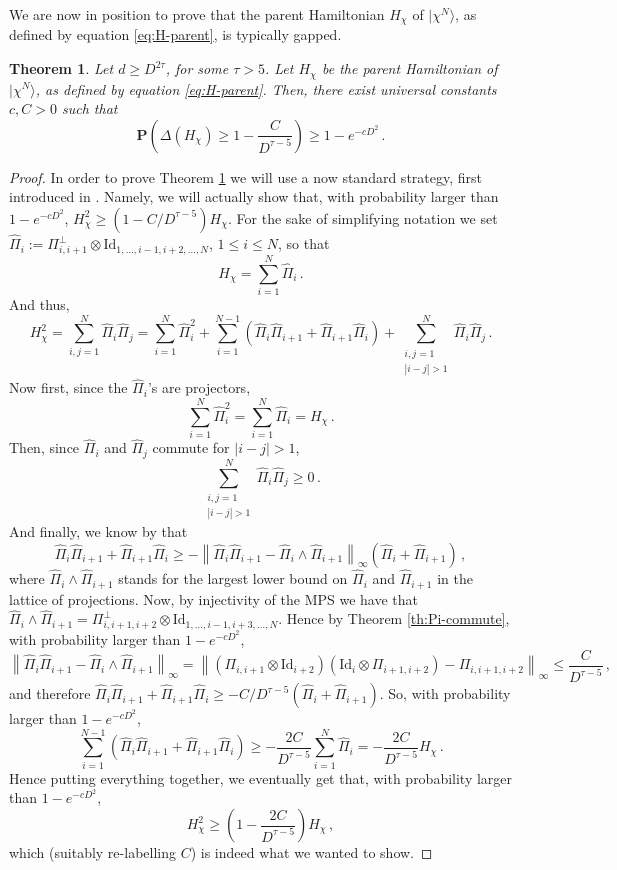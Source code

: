 \documentclass{amsart}
\newtheorem{theorem}{Theorem}[section]
\renewcommand{\P}{\mathbf{P}}
\renewcommand{\leq}{\leqslant}
\renewcommand{\geq}{\geqslant}
\newcommand{\Id}{\mathrm{Id}}
\newcommand{\ket}[1]{| #1 \rangle}
\begin{document}
We are now in position to prove that the parent Hamiltonian $H_{\chi}$ of $\ket{\chi^N}$, as defined by equation \eqref{eq:H-parent}, is typically gapped.

\begin{theorem} \label{th:gap-H}
    Let $d\geq D^{2\tau}$, for some $\tau>5$. Let $H_{\chi}$ be the parent Hamiltonian of $\ket{\chi^N}$, as defined by equation \eqref{eq:H-parent}. Then, there exist universal constants $c,C>0$ such that
    \[ \P\left( \Delta(H_{\chi}) \geq 1-\frac{C}{D^{\tau-5}} \right) \geq 1-e^{-cD^2} \, . \]
\end{theorem}


\begin{proof}
    In order to prove Theorem \ref{th:gap-H} we will use a now standard strategy, first introduced in \cite[Theorem 6.4]{FNW}. Namely, we will actually show that, with probability larger than $1-e^{-cD^2}$, $H_{\chi}^2\geq (1-C/D^{\tau-5})H_{\chi}$. For the sake of simplifying notation we set $\hat{\Pi}_i:= \Pi_{i,i+1}^{\perp}\otimes\Id_{1,\ldots,i-1,i+2,\ldots,N}$, $1\leq i\leq N$, so that
    \[ H_{\chi} = \sum_{i=1}^N \hat{\Pi}_i \, . \]
    And thus,
    \[ H_{\chi}^2 = \sum_{i,j=1}^N \hat{\Pi}_i\hat{\Pi}_j = \sum_{i=1}^N \hat{\Pi}_i^2 + \sum_{i=1}^{N-1} \left(\hat{\Pi}_i\hat{\Pi}_{i+1} + \hat{\Pi}_{i+1}\hat{\Pi}_i \right) + \sum_{\substack{i,j=1 \\ |i-j|>1}}^N \hat{\Pi}_i\hat{\Pi}_j \, . \]
    Now first, since the $\hat{\Pi}_i$'s are projectors,
    \[ \sum_{i=1}^N \hat{\Pi}_i^2 = \sum_{i=1}^N \hat{\Pi}_i = H_{\chi} \, . \]
    Then, since $\hat{\Pi}_i$ and $\hat{\Pi}_j$ commute for $|i-j|>1$,
    \[ \sum_{\substack{i,j=1 \\ |i-j|>1}}^N \hat{\Pi}_i\hat{\Pi}_j \geq 0 \, . \]
    And finally, we know by \cite[Lemma 3]{FNW} that
    \[ \hat{\Pi}_i\hat{\Pi}_{i+1} + \hat{\Pi}_{i+1}\hat{\Pi}_i \geq - \left\|\hat{\Pi}_i\hat{\Pi}_{i+1}-\hat{\Pi}_i\wedge\hat{\Pi}_{i+1}\right\|_\infty \left(\hat{\Pi}_i+\hat{\Pi}_{i+1}\right) \, , \]
    where $\hat{\Pi}_i\wedge\hat{\Pi}_{i+1}$ stands for the largest lower bound on $\hat{\Pi}_i$ and $\hat{\Pi}_{i+1}$ in the lattice of projections. Now, by injectivity of the MPS we have that $\hat{\Pi}_i\wedge\hat{\Pi}_{i+1}=\Pi_{i,i+1,i+2}^\perp\otimes\Id_{1,\ldots,i-1,i+3,\ldots,N}$. Hence by Theorem \ref{th:Pi-commute}, with probability larger than $1-e^{-cD^2}$,
    \[ \left\|\hat{\Pi}_i\hat{\Pi}_{i+1}-\hat{\Pi}_i\wedge\hat{\Pi}_{i+1}\right\|_\infty = \left\|\left(\Pi_{i,i+1}\otimes\Id_{i+2}\right)\left(\Id_i\otimes\Pi_{i+1,i+2}\right)-\Pi_{i,i+1,i+2}\right\|_\infty \leq \frac{C}{D^{\tau-5}} \, , \]
    and therefore $\hat{\Pi}_i\hat{\Pi}_{i+1}+\hat{\Pi}_{i+1}\hat{\Pi}_i\geq -C/D^{\tau-5}(\hat{\Pi}_i+\hat{\Pi}_{i+1})$. So, with probability larger than $1-e^{-cD^2}$,
    \[ \sum_{i=1}^{N-1} \left(\hat{\Pi}_i\hat{\Pi}_{i+1} + \hat{\Pi}_{i+1}\hat{\Pi}_i \right) \geq -\frac{2C}{D^{\tau-5}} \sum_{i=1}^{N}\hat{\Pi}_i = -\frac{2C}{D^{\tau-5}}H_{\chi} \, . \]
    Hence putting everything together, we eventually get that, with probability larger than $1-e^{-cD^2}$,
    \[ H_{\chi}^2 \geq \left(1-\frac{2C}{D^{\tau-5}}\right)H_{\chi} \, , \]
    which (suitably re-labelling $
        C$) is indeed what we wanted to show.
\end{proof}
\end{document}
